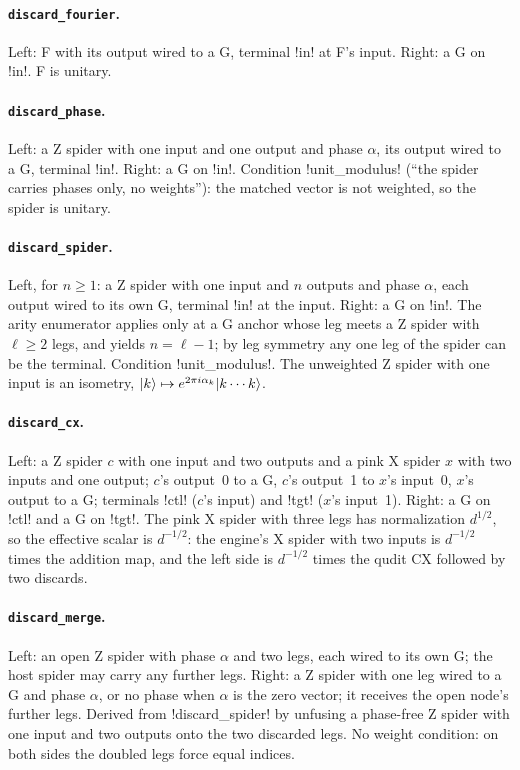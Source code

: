 \paragraph{\texttt{discard\_fourier}.} Left: F with its output wired to a G, terminal \code!in! at F's input. Right: a G on \code!in!. F is unitary.

\paragraph{\texttt{discard\_phase}.} Left: a Z spider with one input and one output and phase $\alpha$, its output wired to a G, terminal \code!in!. Right: a G on \code!in!. Condition \code!unit_modulus! (\enquote{the spider carries phases only, no weights}): the matched vector is not weighted, so the spider is unitary.

\paragraph{\texttt{discard\_spider}.} Left, for $n\ge 1$: a Z spider with one input and $n$ outputs and phase $\alpha$, each output wired to its own G, terminal \code!in! at the input. Right: a G on \code!in!. The arity enumerator applies only at a G anchor whose leg meets a Z spider with $\ell\ge 2$ legs, and yields $n=\ell-1$; by leg symmetry any one leg of the spider can be the terminal. Condition \code!unit_modulus!. The unweighted Z spider with one input is an isometry, $\lvert k \rangle\mapsto e^{2\pi i\alpha_k}\lvert k\cdots k \rangle$.

\paragraph{\texttt{discard\_cx}.} Left: a Z spider $c$ with one input and two outputs and a pink X spider $x$ with two inputs and one output; $c$'s output~0 to a G, $c$'s output~1 to $x$'s input~0, $x$'s output to a G; terminals \code!ctl! ($c$'s input) and \code!tgt! ($x$'s input~1). Right: a G on \code!ctl! and a G on \code!tgt!. The pink X spider with three legs has normalization $d^{1/2}$, so the effective scalar is $d^{-1/2}$: the engine's X spider with two inputs is $d^{-1/2}$ times the addition map, and the left side is $d^{-1/2}$ times the qudit CX followed by two discards.

\paragraph{\texttt{discard\_merge}.} Left: an open Z spider with phase $\alpha$ and two legs, each wired to its own G; the host spider may carry any further legs. Right: a Z spider with one leg wired to a G and phase $\alpha$, or no phase when $\alpha$ is the zero vector; it receives the open node's further legs. Derived from \code!discard_spider! by unfusing a phase-free Z spider with one input and two outputs onto the two discarded legs. No weight condition: on both sides the doubled legs force equal indices.

